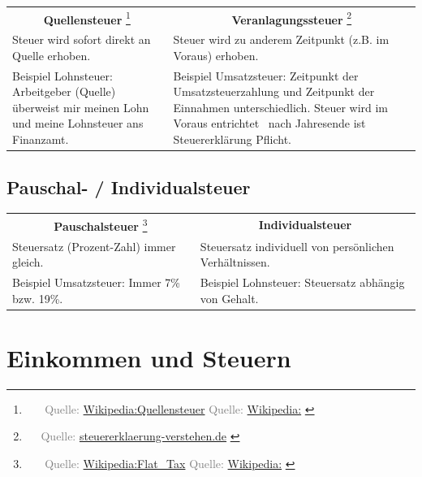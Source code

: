 \documentclass[draft]{beamer}
\let\oldfootnote\footnote
\renewcommand{\footnote}[1]
{%
	\oldfootnote
	{
		\tiny
		\textcolor{gray}{\ #1}
	}%
}
\newcommand{\citewiki}[2][]
{%
	\footnote
	{
		\ifthenelse{\isempty{#1}}
		{
			Quelle: \href{https://de.wikipedia.org/wiki/#2}{Wikipedia:#2}
		}
		{
			Quelle: \href{https://de.wikipedia.org/wiki/#2}{Wikipedia:#1}
		}
	}
}
\newcommand{\citeurl}[2]
{%
	\footnote{Quelle: \href{#1}{#2}}
}
\begin{document}
			\begin{frame}
				\begin{tabularx}{\linewidth}{X|X}
					\multicolumn{1}{c|}{\textbf{Quellensteuer}\citewiki{Quellensteuer}} &
					\multicolumn{1}{c}{\textbf{Veranlagungssteuer}\citeurl{https://www.steuererklaerung-verstehen.de/lexikon/veranlagungssteuer}{steuererklaerung-verstehen.de}} \\[0.25cm]
					Steuer wird sofort direkt an Quelle erhoben. & Steuer wird zu anderem Zeitpunkt (z.B. im Voraus) erhoben.\\
					\vspace{0.25cm} Beispiel Lohnsteuer:\newline
						Arbeitgeber (Quelle) überweist mir meinen Lohn und meine Lohnsteuer ans Finanzamt. &
					\vspace{0.25cm} Beispiel Umsatzsteuer:\newline
						Zeitpunkt der Umsatzsteuerzahlung und Zeitpunkt der Einnahmen unterschiedlich. Steuer wird im Voraus entrichtet \textrightarrow\ nach Jahresende ist Steuererklärung Pflicht.
				\end{tabularx}
			\end{frame}
		
		\subsection{Pauschal- / Individualsteuer}
		
			\begin{frame}
				\begin{tabularx}{\linewidth}{X|X}
					\multicolumn{1}{c|}{\textbf{Pauschalsteuer}\citewiki{Flat\_Tax}} &
					\multicolumn{1}{c}{\textbf{Individualsteuer}} \\[0.25cm]
					Steuersatz (Prozent-Zahl) immer gleich. & Steuersatz individuell von persönlichen Verhältnissen.\\
					\vspace{0.25cm} Beispiel Umsatzsteuer:\newline
						Immer 7\% bzw. 19\%. &
					\vspace{0.25cm} Beispiel Lohnsteuer:\newline
						Steuersatz abhängig von Gehalt.
				\end{tabularx}
			\end{frame}
	
	\section{Einkommen und Steuern}
	
\end{document}
